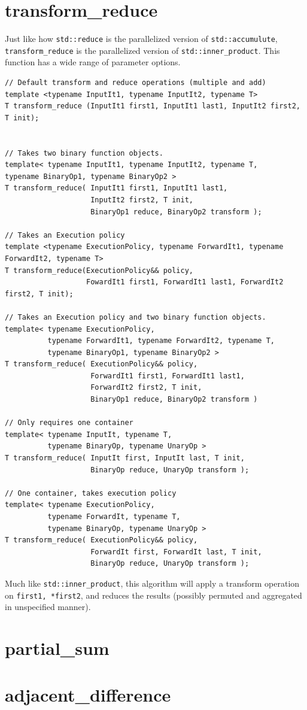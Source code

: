 \documentclass{report}
\begin{document}
\section{transform\_reduce}
Just like how \texttt{std::reduce} is the parallelized version of \texttt{std::accumulute}, \texttt{transform\_reduce} is the parallelized version of \texttt{std::inner\_product}. This function has a wide range of parameter options.
\begin{verbatim}
// Default transform and reduce operations (multiple and add)
template <typename InputIt1, typename InputIt2, typename T> 
T transform_reduce (InputIt1 first1, InputIt1 last1, InputIt2 first2, T init);


// Takes two binary function objects.
template< typename InputIt1, typename InputIt2, typename T,
typename BinaryOp1, typename BinaryOp2 >
T transform_reduce( InputIt1 first1, InputIt1 last1,
                    InputIt2 first2, T init,
                    BinaryOp1 reduce, BinaryOp2 transform );

// Takes an Execution policy
template <typename ExecutionPolicy, typename ForwardIt1, typename ForwardIt2, typename T>
T transform_reduce(ExecutionPolicy&& policy, 
                   FowardIt1 first1, ForwardIt1 last1, ForwardIt2 first2, T init);

// Takes an Execution policy and two binary function objects.
template< typename ExecutionPolicy,
          typename ForwardIt1, typename ForwardIt2, typename T,
          typename BinaryOp1, typename BinaryOp2 >
T transform_reduce( ExecutionPolicy&& policy,
                    ForwardIt1 first1, ForwardIt1 last1,
                    ForwardIt2 first2, T init,
                    BinaryOp1 reduce, BinaryOp2 transform )

// Only requires one container
template< typename InputIt, typename T,
          typename BinaryOp, typename UnaryOp >
T transform_reduce( InputIt first, InputIt last, T init,
                    BinaryOp reduce, UnaryOp transform );

// One container, takes execution policy
template< typename ExecutionPolicy,
          typename ForwardIt, typename T,
          typename BinaryOp, typename UnaryOp >
T transform_reduce( ExecutionPolicy&& policy,
                    ForwardIt first, ForwardIt last, T init,
                    BinaryOp reduce, UnaryOp transform );

\end{verbatim}
Much like \texttt{std::inner\_product}, this algorithm will apply a transform operation on \texttt{first1, *first2}, and reduces the results (possibly permuted and aggregated in unspecified manner).
\section{partial\_sum}
\section{adjacent\_difference}
\end{document}
